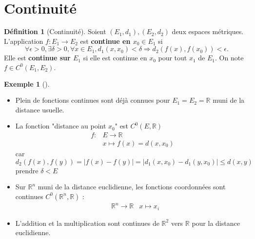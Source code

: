 \documentclass{article}
\theoremstyle{plain}%
\theoremstyle{definition}
\newtheorem{defn}{Définition}[section]
\newtheorem{exmp}{Exemple}[section]
\theoremstyle{remark}
\begin{document}
\section{Continuité}

\begin{defn}[Continuité]
    Soient $ (E_1, d_1), (E_2, d_2) $ deux espaces métriques. L'application $ f: E_1 \to E_2 $ est \textbf{continue en $ x_0 \in E_1 $} si 
    \[
        \forall \epsilon > 0, \exists \delta > 0, \forall x \in E_1, d_1(x, x_0) < \delta \Rightarrow d_2(f(x), f(x_0)) < \epsilon 
    .\]
    Elle est \textbf{continue sur $ E_1 $} si elle est continue en $ x_0 $ pour tout $ x_1 $ de $ E_1 $. On note $ f \in C^0(E_1, E_2) $.
\end{defn}

\begin{exmp}[]
    \begin{itemize}
        \item Plein de fonctions continues sont déjà connues pour $ E_1 = E_2 = \mathbb{R} $ muni de la distance usuelle. 
        
        \item La fonction "distance au point $ x_0 $" est $ C^0 (E, \mathbb{R}) $  
        \begin{align*}
            f : & E \to \mathbb{R} \\
                & x \mapsto f(x) = d(x, x_0)
        \end{align*}
        car $ d_2(f(x), f(y)) = \left| f(x) - f(y) \right| = \left| d_1(x, x_0) - d_1(y,x_0) \right| \leq d(x,y) $ prendre $ \delta < E $ 

        \item Sur $ \mathbb{R}^n $ muni de la distance euclidienne, les fonctions coordonnées sont continues $ C^0(\mathbb{R}^n, \mathbb{R}) $ :
        \begin{align*}
            & \mathbb{R}^n \to \mathbb{R}
            & x \mapsto x_i
        \end{align*}

        \item L'addition et la multiplication sont continues de $ \mathbb{R}^2 $ vers $ \mathbb{R} $ pour la distance euclidienne. 
    \end{itemize}
\end{exmp}
\end{document}
